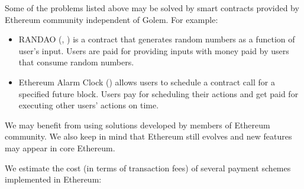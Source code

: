 \documentclass[a4paper]{article}
\begin{document}
    Some of the problems listed above may be solved by smart contracts provided by Ethereum community independent of
    Golem. For example:
    \begin{itemize}
        \item RANDAO (\cite{RANDAO}, \cite{RANDAO2}) is a contract that generates random numbers as a function of
            user's input. Users are paid for providing inputs with money paid by users that consume random numbers.
        \item Ethereum Alarm Clock (\cite{ALARM}) allows users to schedule a contract call for a specified future
            block. Users pay for scheduling their actions and get paid for executing other users' actions on time.
    \end{itemize}

    We may benefit from using solutions developed by members of Ethereum community. We also keep in mind that
    Ethereum still evolves and new features may appear in core Ethereum.

    We estimate the cost (in terms of transaction fees) of several payment schemes implemented in Ethereum:
\end{document}
